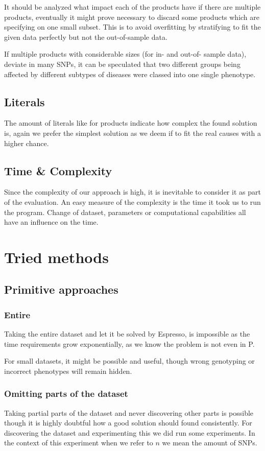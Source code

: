 \documentclass[letterpaper, 11pt]{article}
\begin{document}
It should be analyzed what impact each of the products have if there are multiple products, eventually it might prove necessary to discard some products which are specifying on one small subset. This is to avoid overfitting by stratifying to fit the given data perfectly but not the out-of-sample data.

If multiple products with considerable sizes (for in- and out-of- sample data), deviate in many SNPs, it can be speculated that two different groups being affected by different subtypes of diseases were classed into one single phenotype. 
\subsection{Literals}
The amount of literals like for products indicate how complex the found solution is, again we prefer the simplest solution as we deem if to fit the real causes with a higher chance.
\subsection{Time \& Complexity}
Since the complexity of our approach is high, it is inevitable to consider it as part of the evaluation. An easy measure of the complexity is the time it took us to run the program. Change of dataset, parameters or computational  capabilities all have an influence on the time.
\section{ Tried methods}
\subsection{Primitive approaches}
\subsubsection{Entire}
Taking the entire dataset and let it be solved by Espresso, is impossible as the time requirements grow exponentially, as we know the problem is not even in P. 

For small datasets, it might be possible and useful, though wrong genotyping or incorrect phenotypes will remain hidden. 
\subsubsection{Omitting parts of the dataset}
\label{sec:omit}
Taking partial parts of the dataset and never discovering other parts is possible though it is highly doubtful how a good solution should found consistently. For discovering the dataset and experimenting this we did run some experiments. In the context of this experiment when we refer to $n$ we mean the amount of SNPs. 
\end{document}
